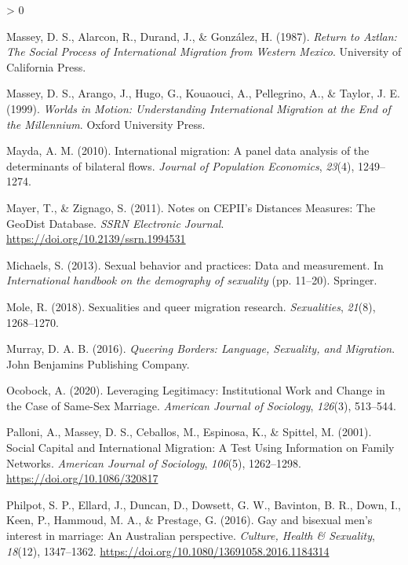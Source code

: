 \documentclass[
  11pt,
]{article}
\newlength{\cslhangindent}
\newenvironment{CSLReferences}[2] %
 {%
  \setlength{\parindent}{0pt}
  \ifodd #1 \everypar{\setlength{\hangindent}{\cslhangindent}}\ignorespaces\fi
  \ifnum #2 > 0
  \setlength{\parskip}{#2\baselineskip}
  \fi
 }%
 {}
\begin{document}
\begin{CSLReferences}{1}{0}
\leavevmode\hypertarget{ref-massey_1987}{}%
Massey, D. S., Alarcon, R., Durand, J., \& González, H. (1987). \emph{Return to {Aztlan}: {The Social Process} of {International Migration} from {Western Mexico}}. {University of California Press}.

\leavevmode\hypertarget{ref-massey_1999}{}%
Massey, D. S., Arango, J., Hugo, G., Kouaouci, A., Pellegrino, A., \& Taylor, J. E. (1999). \emph{Worlds in {Motion}: {Understanding International Migration} at the {End} of the {Millennium}}. {Oxford University Press}.

\leavevmode\hypertarget{ref-mayda_2010}{}%
Mayda, A. M. (2010). International migration: A panel data analysis of the determinants of bilateral flows. \emph{Journal of Population Economics}, \emph{23}(4), 1249--1274.

\leavevmode\hypertarget{ref-mayer_2011}{}%
Mayer, T., \& Zignago, S. (2011). Notes on {CEPII}'s {Distances Measures}: {The GeoDist Database}. \emph{SSRN Electronic Journal}. \url{https://doi.org/10.2139/ssrn.1994531}

\leavevmode\hypertarget{ref-michaels_2013}{}%
Michaels, S. (2013). Sexual behavior and practices: {Data} and measurement. In \emph{International handbook on the demography of sexuality} (pp. 11--20). {Springer}.

\leavevmode\hypertarget{ref-mole_2018a}{}%
Mole, R. (2018). Sexualities and queer migration research. \emph{Sexualities}, \emph{21}(8), 1268--1270.

\leavevmode\hypertarget{ref-murray_2016}{}%
Murray, D. A. B. (2016). \emph{Queering {Borders}: {Language}, {Sexuality}, and {Migration}}. {John Benjamins Publishing Company}.

\leavevmode\hypertarget{ref-ocobock_2020_leveraging}{}%
Ocobock, A. (2020). Leveraging {Legitimacy}: {Institutional Work} and {Change} in the {Case} of {Same}-{Sex Marriage}. \emph{American Journal of Sociology}, \emph{126}(3), 513--544.

\leavevmode\hypertarget{ref-palloni_2001}{}%
Palloni, A., Massey, D. S., Ceballos, M., Espinosa, K., \& Spittel, M. (2001). Social {Capital} and {International Migration}: {A Test Using Information} on {Family Networks}. \emph{American Journal of Sociology}, \emph{106}(5), 1262--1298. \url{https://doi.org/10.1086/320817}

\leavevmode\hypertarget{ref-philpot_2016_gay}{}%
Philpot, S. P., Ellard, J., Duncan, D., Dowsett, G. W., Bavinton, B. R., Down, I., Keen, P., Hammoud, M. A., \& Prestage, G. (2016). Gay and bisexual men's interest in marriage: An {Australian} perspective. \emph{Culture, Health \& Sexuality}, \emph{18}(12), 1347--1362. \url{https://doi.org/10.1080/13691058.2016.1184314}


\end{CSLReferences}
\end{document}
